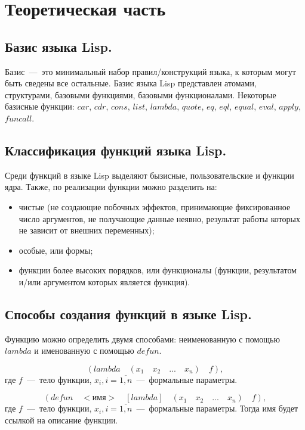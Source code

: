 \setcounter{page}{3}
\chapter{Теоретическая часть}
\section{Базис языка Lisp.}
Базис~---~это минимальный набор правил/конструкций языка, к которым могут быть сведены все остальные. Базис языка Lisp представлен атомами, структурами, базовыми функциями, базовыми функционалами. Некоторые базисные функции: $car$, $cdr$, $cons$, $list$, $lambda$, $quote$, $eq$, $eql$, $equal$, $eval$, $apply$, $funcall$.

\section{Классификация функций языка Lisp.}
Среди функций в языке Lisp выделяют бызисные, пользовательские и функции ядра. Также, по реализации функции можно разделить на:
\begin{itemize}
	\item чистые (не создающие побочных эффектов, принимающие фиксированное число аргументов, не получающие данные неявно, результат работы которых не зависит от внешних переменных);
	\item особые, или формы;
	\item функции более высоких порядков, или функционалы (функции, результатом и/или аргументом которых является функция).
\end{itemize}

\section{Способы создания функций в языке Lisp.}
Функцию можно определить двумя способами: неименованную с помощью $lambda$ и именованную с помощью $defun$.

\begin{equation}
	\nonumber (lambda \quad (x_1 \quad x_2 \quad ... \quad x_n) \quad f),
\end{equation}
где $f$~---~тело функции, $x_i, i = \overline{1, n}$~---~формальные параметры.

\begin{equation}
	\nonumber (defun \quad <\text{имя}> \quad [lambda] \quad (x_1 \quad x_2 \quad ... \quad x_n) \quad f),
\end{equation}
где $f$~---~тело функции, $x_i, i = \overline{1, n}$~---~формальные параметры. Тогда имя будет ссылкой на описание функции.

